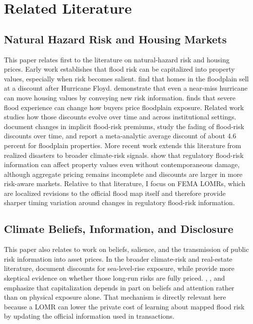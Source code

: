 \documentclass[12pt]{article}
\begin{document}
\section{Related Literature}\label{sec:literature}

\subsection{Natural Hazard Risk and Housing Markets}\label{sec:lit_hazard}

This paper relates first to the literature on natural-hazard risk and housing prices. Early work establishes that flood risk can be capitalized into property values, especially when risk becomes salient. \citet{BinPolasky2004} find that homes in the floodplain sell at a discount after Hurricane Floyd. \citet{HallstromSmith2005} demonstrate that even a near-miss hurricane can move housing values by conveying new risk information. \citet{Kousky2010} finds that severe flood experience can change how buyers price floodplain exposure. Related work studies how those discounts evolve over time and across institutional settings. \citet{BinLandry2013} document changes in implicit flood-risk premiums, \citet{AtreyaFerreiraKriesel2013} study the fading of flood-risk discounts over time, and \citet{BeltranMaddisonElliott2018} report a meta-analytic average discount of about 4.6 percent for floodplain properties. More recent work extends this literature from realized disasters to broader climate-risk signals. \citet{HinoBurke2021} show that regulatory flood-risk information can affect property values even without contemporaneous damage, although aggregate pricing remains incomplete and discounts are larger in more risk-aware markets. Relative to that literature, I focus on FEMA LOMRs, which are localized revisions to the official flood map itself and therefore provide sharper timing variation around changes in regulatory flood-risk information.

\subsection{Climate Beliefs, Information, and Disclosure}\label{sec:lit_disclosure}

This paper also relates to work on beliefs, salience, and the transmission of public risk information into asset prices. In the broader climate-risk and real-estate literature, \citet{BernsteinGustafsonLewis2019} document discounts for sea-level-rise exposure, while \citet{MurfinSpiegel2020} provide more skeptical evidence on whether those long-run risks are fully priced. \citet{BakkensenBarrage2022}, \citet{GibsonMullinsHill2020}, and \citet{BaldaufGarlappiYannelis2020} emphasize that capitalization depends in part on beliefs and attention rather than on physical exposure alone. That mechanism is directly relevant here because a LOMR can lower the private cost of learning about mapped flood risk by updating the official information used in transactions.
\end{document}

